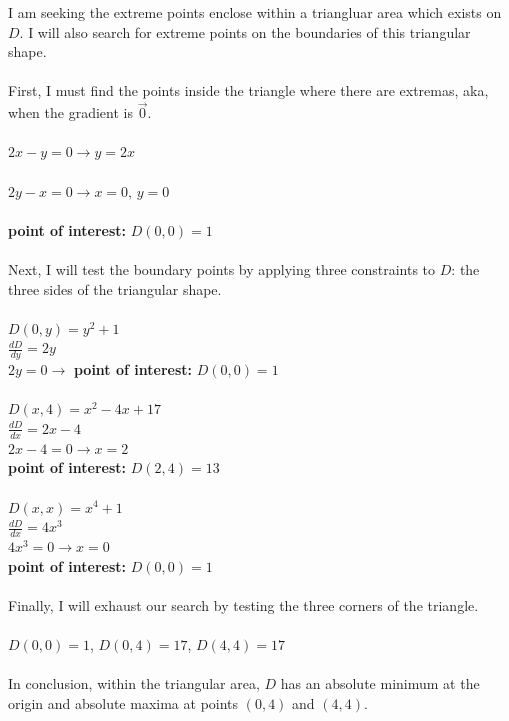 \documentclass[12pt]{article}
\begin{document}
\noindent I am seeking the extreme points enclose within a triangluar area which exists on $D$. I will also search 
for extreme points on the boundaries of this triangular shape. \\\\
\noindent First, I must find the points inside the triangle where there are extremas, aka, when the gradient is $\vec{0}$.\\\\
\noindent $2x - y = 0 \rightarrow y = 2x$\\\\
\noindent $2y - x = 0 \rightarrow x = 0\text{, } y = 0$\\\\
\noindent \textbf{point of interest: }$D(0,0) = 1$\\\\
\noindent Next, I will test the boundary points by applying three constraints to $D$: the three sides of the triangular shape.\\\\
\noindent $D(0, y) = y^{2} + 1$\\
\noindent $\frac{dD}{dy} = 2y$\\
\noindent $2y = 0 \rightarrow$ \textbf{point of interest: } $D(0, 0) = 1$\\\\
\noindent $D(x, 4) = x^{2}-4x+17$\\
\noindent $\frac{dD}{dx} =2x -4$\\
\noindent $2x -4 = 0 \rightarrow x = 2$\\
\noindent \textbf{point of interest: } $D(2, 4) = 13$\\\\
\noindent $D(x, x) = x^{4}+1$\\
\noindent $\frac{dD}{dx} =4x^{3}$\\
\noindent $4x^{3} = 0 \rightarrow x = 0$\\
\noindent \textbf{point of interest: } $D(0, 0) = 1$\\\\
\noindent Finally, I will exhaust our search by testing the three corners of the triangle.\\\\
\noindent $D(0,0) = 1$, \hspace{10pt} $D(0,4) = 17$, \hspace{10pt} $D(4, 4) = 17$\\\\
\noindent In conclusion, within the triangular area, $D$ has an absolute minimum at the origin and absolute maxima at points $(0,4)$ and $(4,4)$.\\\\\\
\end{document}
